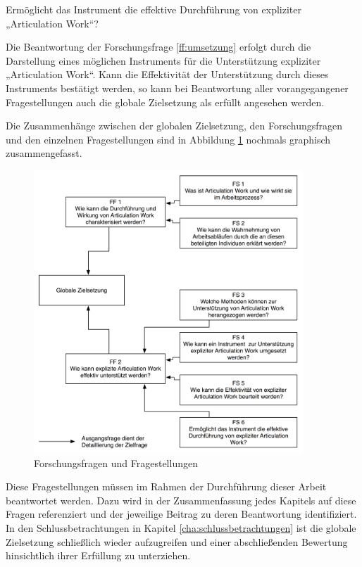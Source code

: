 \begin{tf}
	\label{tf:empirie}
	Ermöglicht das Instrument die effektive Durchführung von expliziter „Articulation Work“?
\end{tf}

Die Beantwortung der Forschungsfrage \ref{ff:umsetzung} erfolgt durch die Darstellung eines möglichen Instruments für die Unterstützung expliziter „Articulation Work“. Kann die Effektivität der Unterstützung durch dieses Instruments bestätigt werden, so kann bei Beantwortung aller vorangegangener Fragestellungen auch die globale Zielsetzung als erfüllt angesehen werden.

Die Zusammenhänge zwischen der globalen Zielsetzung, den Forschungsfragen und den einzelnen Fragestellungen sind in Abbildung \ref{fig:img_Einfuehrung_zielhierarchie} nochmals graphisch zusammengefasst. 

\begin{figure}[htbp]
	\centering
		\includegraphics[width=0.9\textwidth]{img/Einfuehrung/zielhierarchie.png}
	\caption{Forschungsfragen und Fragestellungen}
	\label{fig:img_Einfuehrung_zielhierarchie}
\end{figure}

Diese Fragestellungen müssen im Rahmen der Durchführung dieser Arbeit beantwortet werden. Dazu wird in der Zusammenfassung jedes Kapitels auf diese Fragen referenziert und der jeweilige Beitrag zu deren Beantwortung identifiziert. In den Schlussbetrachtungen in Kapitel \ref{cha:schlussbetrachtungen} ist die globale Zielsetzung schließlich wieder aufzugreifen und einer abschließenden Bewertung hinsichtlich ihrer Erfüllung zu unterziehen. 

